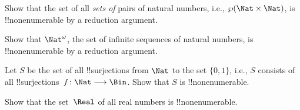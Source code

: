 \documentclass[../../../include/open-logic-section]{subfiles}
\begin{document}
\begin{prob}
Show that the set of all \emph{sets of} pairs of natural numbers,
i.e., $\Pow{\Nat \times \Nat}$, is !!{nonenumerable} by a reduction
argument.
\end{prob}

\begin{prob}
Show that $\Nat^\omega$, the set of infinite sequences of natural
numbers, is !!{nonenumerable} by a reduction argument.
\end{prob}


\begin{prob}
Let $S$ be the set of all !!{surjection}s from $\Nat$ to the set
$\{0,1\}$, i.e., $S$ consists of all !!{surjection}s~$f \colon \Nat
\to \Bin$.  Show that $S$ is !!{nonenumerable}.
\end{prob}

\begin{prob}
Show that the set~$\Real$ of all real numbers is !!{nonenumerable}.
\end{prob}
\end{document}
